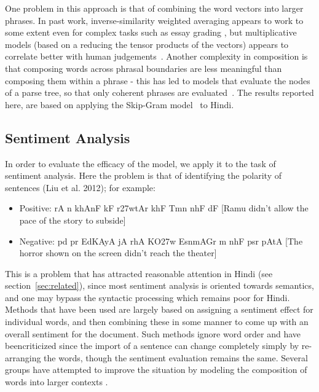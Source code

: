 \cite{Chirawichitchai:14}
\cite{Sharma:14}
One problem in this approach is that of 
combining the word vectors into larger phrases.  In past work,
inverse-similarity weighted averaging appears
to work to some extent even for complex tasks such as essay grading \cite{Landauer:03},
but multiplicative models (based on a reducing the tensor products of the
vectors) appears to correlate better with human
judgements~\cite{Mitchell:08,Socher:13}.
Another complexity in composition is that composing words across phrasal
boundaries are less meaningful than composing them within a phrase - this has
led to models that evaluate the nodes of a parse tree, so that only coherent
phrases are
evaluated~\cite{Socher:13}. 
The results reported here, are based on applying the Skip-Gram  model~\cite{Mikolov:13b} to Hindi. 

\subsection{Sentiment Analysis}

In order to evaluate the efficacy of the model, we apply it to the task of sentiment analysis. Here the problem is that of identifying the polarity of sentences (Liu et al. 2012); for example: 
\begin{itemize}
\item Positive: {\dn rA n\? khAnF kF r\327wtAr khF{\qva} Tmn\? nhF{\qva} dF} [Ramu didn't allow the pace of the story to subside]
\item Negative: {\dn pd\?{\qvb} pr EdKAyA jA rhA KO\327w Esn\?mAGr m\?
nhF{\qva} psr pAtA} [The horror shown on the screen didn't reach the theater]
\end{itemize}

This is a problem that has attracted reasonable attention in Hindi (see section~\ref{sec:related}), since most sentiment analysis is oriented towards semantics, and one may bypass the syntactic
processing which remains poor for Hindi. Methods that have been used are largely based on assigning a sentiment effect for individual words, and then combining these in some manner to come up with an overall sentiment for the document. Such methods ignore word order and have beencriticized since the import of a sentence can change completely simply by re-arranging the words, though the sentiment evaluation remains the same. Several groups have attempted to improve the situation by modeling the composition of words into larger contexts \cite{Le:14,Socher:13,Johnson:14,Baroni:14}.

